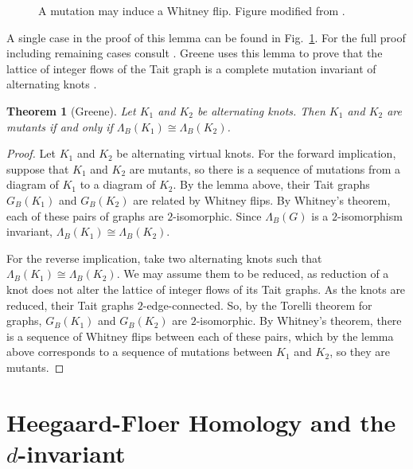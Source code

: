 \documentclass[12pt]{report}
\newtheorem*{theorem}{Theorem}
\theoremstyle{upright}
\begin{document}
\begin{figure}[hbt!]
	\centering
	\def\svgscale{0.65}
	
	
	\caption{A mutation may induce a Whitney flip. Figure modified from \cite[Fig.~2]{lattices-graphs-mutation}.}
	\label{fig:mutation-whitney-flip}
\end{figure}

A single case in the proof of this lemma can be found in Fig.~\ref{fig:mutation-whitney-flip}. For the full proof including remaining cases consult \cite[Fig. 2-4]{lattices-graphs-mutation}. Greene uses this lemma to prove that the lattice of integer flows of the Tait graph is a complete mutation invariant of alternating knots \cite[Proposition 4.4]{lattices-graphs-mutation}.

\begin{theorem}[Greene]
Let $K_{1}$ and $K_{2}$ be alternating knots. Then $K_{1}$ and $K_{2}$ are mutants if and only if  $\Lambda_{B}(K_{1}) \cong \Lambda_{B}(K_{2})$.
\end{theorem}

\begin{proof}
Let $K_{1}$ and $K_{2}$ be alternating virtual knots. For the forward implication, suppose that $K_{1}$ and $K_{2}$ are mutants, so there is a sequence of mutations from a diagram of $K_{1}$ to a diagram of $K_{2}$. By the lemma above, their Tait graphs $G_{B}(K_{1})$ and $G_{B}(K_{2})$  are related by Whitney flips. By Whitney's theorem, each of these pairs of graphs are $2$-isomorphic. Since $\Lambda_{B}(G)$ is a $2$-isomorphism invariant, $\Lambda_{B}(K_{1}) \cong \Lambda_{B}(K_{2})$.

For the reverse implication, take two alternating knots such that $\Lambda_{B}(K_{1}) \cong \Lambda_{B}(K_{2})$. We may assume them to be reduced, as reduction of a knot does not alter the lattice of integer flows of its Tait graphs. As the knots are reduced, their Tait graphs $2$-edge-connected. So, by the Torelli theorem for graphs, $G_{B}(K_{1})$ and $G_{B}(K_{2})$ are $2$-isomorphic. By Whitney's theorem, there is a sequence of Whitney flips between each of these pairs, which by the lemma above corresponds to a sequence of mutations between $K_{1}$ and $K_{2}$, so they are mutants.
\end{proof}

\section{Heegaard-Floer Homology and the $d$-invariant}
\end{document}
